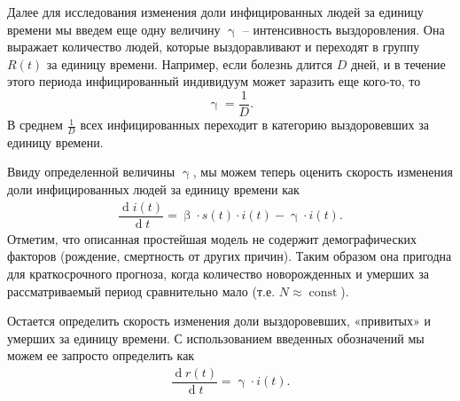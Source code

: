 \documentclass[a4paper, 12pt]{extarticle}
\numberwithin{equation}{section}
\renewcommand{\beta}{\upbeta}
\renewcommand{\gamma}{\upgamma}
\renewcommand{\d}{\operatorname{d}}
\begin{document}
	Далее для исследования изменения доли инфицированных людей за единицу времени мы введем еще одну величину $\gamma$ -- интенсивность выздоровления. Она выражает количество людей, которые
	выздоравливают и переходят в группу $R(t)$ за единицу времени. Например, если болезнь длится $D$ дней, и в течение этого
	периода инфицированный индивидуум может заразить еще кого-то, то $$\gamma = \dfrac 1D.$$
	В среднем $\frac 1D$ всех инфицированных переходит в категорию выздоровевших за единицу времени.
	
	Ввиду определенной величины $\gamma$, мы можем теперь оценить скорость изменения доли инфицированных людей за единицу времени как \begin{eqnarray}
		\dfrac{\d i(t)}{\d t} = \beta \cdot s(t)\cdot i(t) - \gamma\cdot i(t).
	\end{eqnarray}
	Отметим, что описанная простейшая модель не содержит демографических
	факторов (рождение, смертность от других причин). Таким образом она пригодна для
	краткосрочного прогноза, когда количество новорожденных и умерших за
	рассматриваемый период сравнительно мало (т.е. $N\approx \operatorname{const}$).
	
	Остается определить скорость изменения доли выздоровевших, «привитых» и умерших за единицу времени. С использованием введенных обозначений мы можем ее запросто определить как  
	\begin{eqnarray}
		\dfrac{\d r(t)}{\d t} = \gamma\cdot i(t).
	\end{eqnarray}
	
\end{document}
